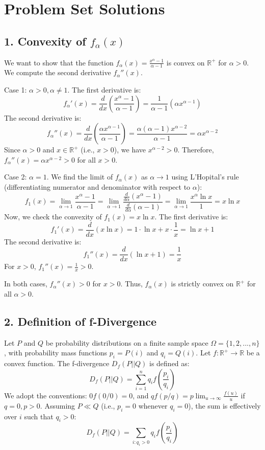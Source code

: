 \documentclass{article}
\begin{document}
\section*{Problem Set Solutions}

\subsection*{1. Convexity of $f_\alpha(x)$}

We want to show that the function $f_\alpha(x) = \frac{x^\alpha - 1}{\alpha - 1}$ is convex on $\mathbb{R}^+$ for $\alpha > 0$. We compute the second derivative $f_\alpha''(x)$.

Case 1: $\alpha > 0, \alpha \neq 1$.
The first derivative is:
\[ f_\alpha'(x) = \frac{d}{dx} \left( \frac{x^\alpha - 1}{\alpha - 1} \right) = \frac{1}{\alpha - 1} (\alpha x^{\alpha - 1}) \]
The second derivative is:
\[ f_\alpha''(x) = \frac{d}{dx} \left( \frac{\alpha x^{\alpha - 1}}{\alpha - 1} \right) = \frac{\alpha (\alpha - 1) x^{\alpha - 2}}{\alpha - 1} = \alpha x^{\alpha - 2} \]
Since $\alpha > 0$ and $x \in \mathbb{R}^+$ (i.e., $x > 0$), we have $x^{\alpha - 2} > 0$.
Therefore, $f_\alpha''(x) = \alpha x^{\alpha - 2} > 0$ for all $x > 0$.

Case 2: $\alpha = 1$.
We find the limit of $f_\alpha(x)$ as $\alpha \to 1$ using L'Hopital's rule (differentiating numerator and denominator with respect to $\alpha$):
\[ f_1(x) = \lim_{\alpha \to 1} \frac{x^\alpha - 1}{\alpha - 1} = \lim_{\alpha \to 1} \frac{\frac{d}{d\alpha}(x^\alpha - 1)}{\frac{d}{d\alpha}(\alpha - 1)} = \lim_{\alpha \to 1} \frac{x^\alpha \ln x}{1} = x \ln x \]
Now, we check the convexity of $f_1(x) = x \ln x$.
The first derivative is:
\[ f_1'(x) = \frac{d}{dx}(x \ln x) = 1 \cdot \ln x + x \cdot \frac{1}{x} = \ln x + 1 \]
The second derivative is:
\[ f_1''(x) = \frac{d}{dx}(\ln x + 1) = \frac{1}{x} \]
For $x > 0$, $f_1''(x) = \frac{1}{x} > 0$.

In both cases, $f_\alpha''(x) > 0$ for $x > 0$. Thus, $f_\alpha(x)$ is strictly convex on $\mathbb{R}^+$ for all $\alpha > 0$.

\subsection*{2. Definition of f-Divergence}

Let $P$ and $Q$ be probability distributions on a finite sample space $\Omega = \{1, 2, ..., n\}$, with probability mass functions $p_i = P(i)$ and $q_i = Q(i)$. Let $f: \mathbb{R}^+ \to \mathbb{R}$ be a convex function. The f-divergence $D_f(P||Q)$ is defined as:
\[ D_f(P||Q) = \sum_{i=1}^n q_i f\left(\frac{p_i}{q_i}\right) \]
We adopt the conventions: $0 f(0/0) = 0$, and $q f(p/q) = p \lim_{u \to \infty} \frac{f(u)}{u}$ if $q=0, p>0$. Assuming $P \ll Q$ (i.e., $p_i=0$ whenever $q_i=0$), the sum is effectively over $i$ such that $q_i > 0$:
\[ D_f(P||Q) = \sum_{i: q_i > 0} q_i f\left(\frac{p_i}{q_i}\right) \]
\end{document}
